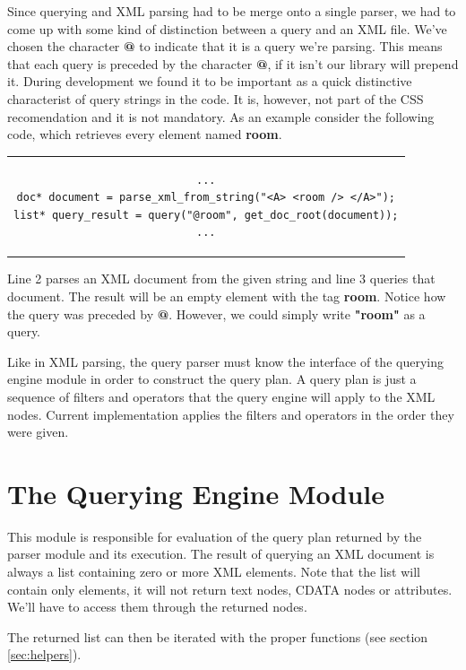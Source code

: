 \documentclass[a4paper]{report}
\begin{document}
		Since querying and XML parsing had to be merge onto a single parser, we had to come up with some kind of distinction between a query and an XML file. We've chosen the character \textbf{@} to indicate that it is a query we're parsing. This means that each query is preceded by the character \textbf{@}, if it isn't our library will prepend it. During development we found it to be important as a quick distinctive characterist of query strings in the code. It is, however, not part of the CSS recomendation and it is not mandatory. As an example consider the following code, which retrieves every element named \textbf{room}.

\begin{center}
	\lstset{language=C,numbers=left, captionpos=b, caption=Sample query to a DOM tree.}
		\begin{tabular}{c}
	\begin{lstlisting}
...
doc* document = parse_xml_from_string("<A> <room /> </A>");
list* query_result = query("@room", get_doc_root(document));
...
	\end{lstlisting}
	\end{tabular}
	\end{center}

		Line 2 parses an XML document from the given string and line 3 queries that document. The result will be an empty element with the tag \textbf{room}. Notice how the query was preceded by \textbf{@}. However, we could simply write \textbf{"room"} as a query.

		Like in XML parsing, the query parser must know the interface of the querying engine module in order to construct the query plan. A query plan is just a sequence of filters and operators that the query engine will apply to the XML nodes. Current implementation applies the filters and operators in the order they were given.

\section{The Querying Engine Module}\label{sec:sels}
	This module is responsible for evaluation of the query plan returned by the parser module and its execution. The result of querying an XML document is always a list containing zero or more XML elements. Note that the list will contain only elements, it will not return text nodes, CDATA nodes or attributes. We'll have to access them through the returned nodes.

	The returned list can then be iterated with the proper functions (see section \ref{sec:helpers}).
\end{document}
